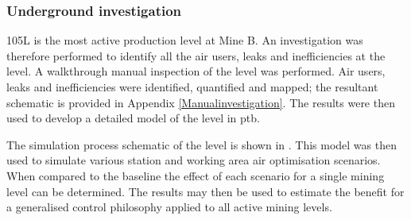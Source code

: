 	\subsubsection{Underground investigation}
	105L is the most active production level at Mine B. An investigation was therefore performed to identify all the air users, leaks and inefficiencies  at the level. A walkthrough manual inspection of the level was performed. Air users, leaks and inefficiencies were identified, quantified and mapped; the resultant schematic is provided in Appendix \ref{Manualinvestigation}. The results were then used to develop a detailed model of the level in \gls{ptb}. 
	\par 
	The simulation process schematic of the level is shown in . This model was then used to simulate various station and working area air optimisation scenarios. When compared to the baseline the effect of each scenario for a single mining level can be determined. The results may then be used to estimate the benefit for a generalised control philosophy applied to all active mining levels.
